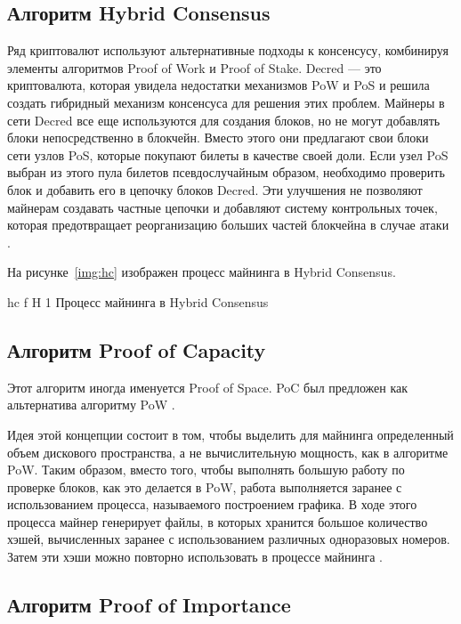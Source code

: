 \subsection{Алгоритм Hybrid Consensus}

Ряд криптовалют используют альтернативные подходы к консенсусу, комбинируя элементы алгоритмов Proof of Work и Proof of Stake. 
Decred --- это криптовалюта, которая увидела недостатки механизмов PoW и PoS и решила создать гибридный механизм консенсуса для решения этих проблем. 
Майнеры в сети Decred все еще используются для создания блоков, но не могут добавлять блоки непосредственно в блокчейн. 
Вместо этого они предлагают свои блоки сети узлов PoS, которые покупают билеты в качестве своей доли. 
Если узел PoS выбран из этого пула билетов псевдослучайным образом, необходимо проверить блок и добавить его в цепочку блоков Decred. 
Эти улучшения не позволяют майнерам создавать частные цепочки и добавляют систему контрольных точек, которая предотвращает реорганизацию больших частей блокчейна в случае атаки \cite{Auhl2022}.

На рисунке~\ref{img:hc} изображен процесс майнинга в Hybrid Consensus.

    {hc}
    {f}
    {H}
    {1\textwidth}
    {Процесс майнинга в Hybrid Consensus \cite{Auhl2022}}

\subsection{Алгоритм Proof of Capacity}

Этот алгоритм иногда именуется Proof of Space. 
PoC был предложен как альтернатива алгоритму PoW \cite{Kolmogorov1982}.

Идея этой концепции состоит в том, чтобы выделить для майнинга определенный объем дискового пространства, а не вычислительную мощность, как в алгоритме PoW. 
Таким образом, вместо того, чтобы выполнять большую работу по проверке блоков, как это делается в PoW, работа выполняется заранее с использованием процесса, называемого построением графика. 
В ходе этого процесса майнер генерирует файлы, в которых хранится большое количество хэшей, вычисленных заранее с использованием различных одноразовых номеров. 
Затем эти хэши можно повторно использовать в процессе майнинга \cite[362]{Azbeg2020}.

\subsection{Алгоритм Proof of Importance}

